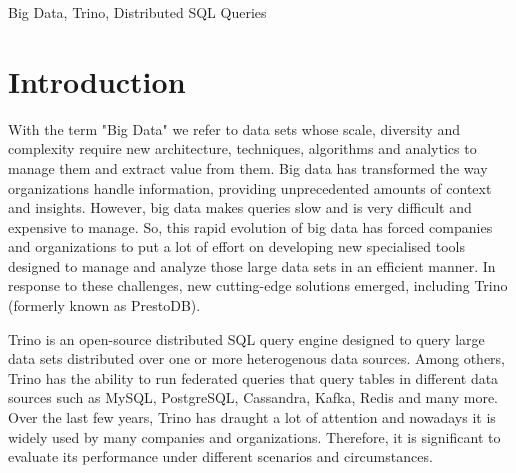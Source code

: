 \documentclass[conference]{IEEEtran}
\begin{document}
\begin{IEEEkeywords}
    Big Data, Trino, Distributed SQL Queries
\end{IEEEkeywords}

\section{Introduction}
With the term "Big Data" we refer to data sets whose scale, diversity and complexity require new
architecture, techniques, algorithms and analytics to manage them and extract value from them.
Big data has transformed the way organizations handle information, providing unprecedented
amounts of context and insights. However, big data makes queries slow and is very difficult and
expensive to manage. So, this rapid evolution of big data has forced companies and organizations
to put a lot of effort on  developing new specialised tools designed to manage and analyze those
large data sets in an efficient manner. In response to these challenges, new cutting-edge solutions
emerged, including Trino (formerly known as PrestoDB).

Trino is an open-source distributed SQL query engine designed to query large data sets distributed over
one or more heterogenous data sources. Among others, Trino has the ability to run federated queries that
query tables in different data sources such as MySQL, PostgreSQL, Cassandra, Kafka, Redis and many more.
Over the last few years, Trino has draught a lot of attention and nowadays it is widely used by many
companies and organizations. Therefore, it is significant to evaluate its performance under different
scenarios and circumstances.
\end{document}
